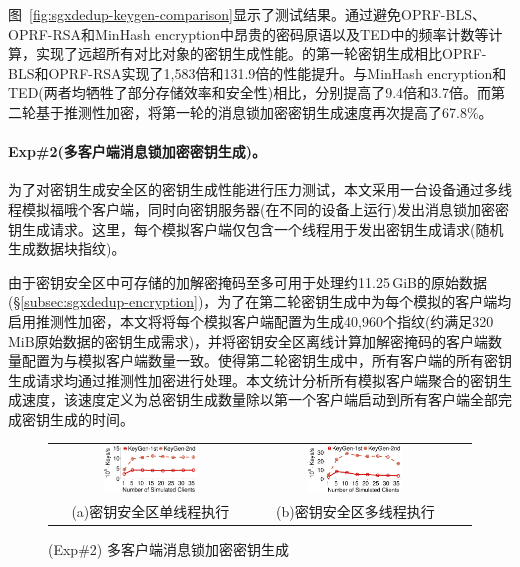 图~\ref{fig:sgxdedup-keygen-comparison}显示了测试结果。\sysnameS 通过避免OPRF-BLS、OPRF-RSA和MinHash encryption中昂贵的密码原语以及TED中的频率计数等计算，实现了远超所有对比对象的密钥生成性能。\sysnameS 的第一轮密钥生成相比OPRF-BLS和OPRF-RSA实现了1,583倍和131.9倍的性能提升。与MinHash encryption和TED(两者均牺牲了部分存储效率和安全性)相比，分别提高了9.4倍和3.7倍。而第二轮基于推测性加密，\sysnameS 将第一轮的消息锁加密密钥生成速度再次提高了67.8\%。

\paragraph*{Exp\#2(多客户端消息锁加密密钥生成)。}为了对密钥生成安全区的密钥生成性能进行压力测试，本文采用一台设备通过多线程模拟福哦个客户端，同时向密钥服务器(在不同的设备上运行)发出消息锁加密密钥生成请求。这里，每个模拟客户端仅包含一个线程用于发出密钥生成请求(随机生成数据块指纹)。

由于密钥安全区中可存储的加解密掩码至多可用于处理约11.25\,GiB的原始数据(\S\ref{subsec:sgxdedup-encryption})，为了在第二轮密钥生成中为每个模拟的客户端均启用推测性加密，本文将将每个模拟客户端配置为生成40,960个指纹(约满足320\,MiB原始数据的密钥生成需求)，并将密钥安全区离线计算加解密掩码的客户端数量配置为与模拟客户端数量一致。使得第二轮密钥生成中，所有客户端的所有密钥生成请求均通过推测性加密进行处理。本文统计分析所有模拟客户端聚合的密钥生成速度，该速度定义为总密钥生成数量除以第一个客户端启动到所有客户端全部完成密钥生成的时间。

\begin{figure}[!htb]
    \small
    \centering
    \begin{tabular}{@{}c@{}c@{}c}
        \includegraphics[width=0.49\textwidth]{pic/sgxdedup/expa3_keyScale_performance_number_singleThread.pdf} & 
        \hspace{5pt}
        \includegraphics[width=0.49\textwidth]{pic/sgxdedup/expa3_keyScale_performance_number_multiThread.pdf}     \\
        \mbox{\small (a)密钥安全区单线程执行}                                                                   & 
        \mbox{\small (b)密钥安全区多线程执行}                                                                      \\
    \end{tabular}
    \caption{(Exp\#2) 多客户端消息锁加密密钥生成}
    \label{fig:sgxdedup-exp-keygen-scalability}
\end{figure}

